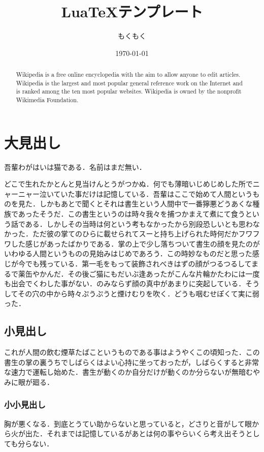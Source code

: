 \documentclass[10pt,a4paper]{ltjsarticle}       %
\title{Lua\TeX テンプレート}
\author{もくもく}
\date{\today}
\begin{document}
\maketitle
\thispagestyle{fancy}

\begin{abstract}
Wikipedia is a free online encyclopedia with the aim to allow anyone to edit articles. Wikipedia is the largest and most popular general reference work on the Internet and is ranked among the ten most popular websites. Wikipedia is owned by the nonprofit Wikimedia Foundation.
\end{abstract}

\tableofcontents
\clearpage

\section{大見出し \label{Sec:1}}
吾輩わがはいは猫である．名前はまだ無い．

どこで生れたかとんと見当けんとうがつかぬ．何でも薄暗いじめじめした所でニャーニャー泣いていた事だけは記憶している．吾輩はここで始めて人間というものを見た．しかもあとで聞くとそれは書生という人間中で一番獰悪どうあくな種族であったそうだ．この書生というのは時々我々を捕つかまえて煮にて食うという話である．しかしその当時は何という考もなかったから別段恐しいとも思わなかった．ただ彼の掌てのひらに載せられてスーと持ち上げられた時何だかフワフワした感じがあったばかりである．掌の上で少し落ちついて書生の顔を見たのがいわゆる人間というものの見始みはじめであろう．この時妙なものだと思った感じが今でも残っている．第一毛をもって装飾されべきはずの顔がつるつるしてまるで薬缶やかんだ．その後ご猫にもだいぶ逢あったがこんな片輪かたわには一度も出会でくわした事がない．のみならず顔の真中があまりに突起している．そうしてその穴の中から時々ぷうぷうと煙けむりを吹く．どうも咽むせぽくて実に弱った．

\subsection{小見出し \label{Ssec:1}}
これが人間の飲む煙草たばこというものである事はようやくこの頃知った．この書生の掌の裏うちでしばらくはよい心持に坐っておったが，しばらくすると非常な速力で運転し始めた．書生が動くのか自分だけが動くのか分らないが無暗むやみに眼が廻る．

\subsubsection{小小見出し \label{Sssec:1}}
胸が悪くなる．到底とうてい助からないと思っていると，どさりと音がして眼から火が出た．それまでは記憶しているがあとは何の事やらいくら考え出そうとしても分らない．
\end{document}
